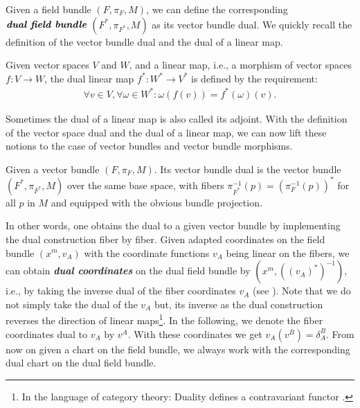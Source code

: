 Given a field bundle $(F, \pi_F, M)$, we can define the corresponding $\textit{\textbf{dual field bundle}}$ $(F^{\ast}, \pi_{F^{\ast}},M)$ as its vector bundle dual. We quickly recall the definition of the vector bundle dual and the dual of a linear map.
\begin{definition} \label{dual}
Given vector spaces $V$ and $W$, and a linear map, i.e., a morphism of vector spaces $f : V \rightarrow W$, the dual linear map $f^{\ast} : W^{\ast} \rightarrow V^{\ast}$ is defined by the requirement:
\begin{align}
    \forall v \in V, \forall \omega \in W^{\ast} : \omega (f(v)) = f^{\ast}(\omega) (v).
\end{align}
\end{definition}
Sometimes the dual of a linear map is also called its adjoint. With the definition of the vector space dual and the dual of a linear map, we can now lift these notions to the case of vector bundles and vector bundle morphisms.
\begin{definition} 
Given a vector bundle $(F, \pi_F,M)$. Its vector bundle dual is the vector bundle $(F^{\ast}, \pi_{F^{\ast}},M)$ over the same base space, with fibers $\pi_{F^{\ast}}^{-1}(p) = (\pi_F^{-1}(p))^{\ast} $ for all $p$ in $M$ and equipped with the obvious bundle projection.  
\end{definition}

In other words, one obtains the dual to a given vector bundle by implementing the dual construction fiber by fiber.
Given adapted coordinates on the field bundle $(x^m, v_A)$ with the coordinate functions $v_A$ being linear on the fibers, we can obtain \textbf{\textit{dual coordinates}} on the dual field bundle by $(x^m, ((v_A)^{\ast})^{-1})$, i.e., by taking the inverse dual of the fiber coordinates $v_A$ (see \cite{saunders_1989}). Note that we do not simply take the dual of the $v_A$ but, its inverse as the dual construction reverses the direction of linear maps\footnote{In the language of category theory: Duality defines a contravariant functor \cite{MacLane:205493}.}. In the following, we denote the fiber coordinates dual to $v_A$ by $v^A$. With these coordinates we get $ v_A(v^B) = \delta_A^B$. From now on given a chart on the field bundle, we always work with the corresponding dual chart on the dual field bundle.

